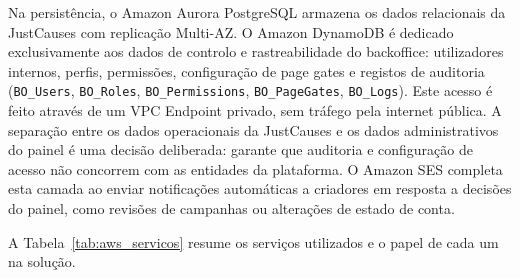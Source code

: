 Na persistência, o Amazon Aurora PostgreSQL armazena os dados relacionais da JustCauses com replicação Multi-AZ. O Amazon DynamoDB é dedicado exclusivamente aos dados de controlo e rastreabilidade do backoffice: utilizadores internos, perfis, permissões, configuração de page gates e registos de auditoria (\texttt{BO\_Users}, \texttt{BO\_Roles}, \texttt{BO\_Permissions}, \texttt{BO\_PageGates}, \texttt{BO\_Logs}). Este acesso é feito através de um VPC Endpoint privado, sem tráfego pela internet pública. A separação entre os dados operacionais da JustCauses e os dados administrativos do painel é uma decisão deliberada: garante que auditoria e configuração de acesso não concorrem com as entidades da plataforma. O Amazon SES completa esta camada ao enviar notificações automáticas a criadores em resposta a decisões do painel, como revisões de campanhas ou alterações de estado de conta.

A Tabela~\ref{tab:aws_servicos} resume os serviços utilizados e o papel de cada um na solução.

